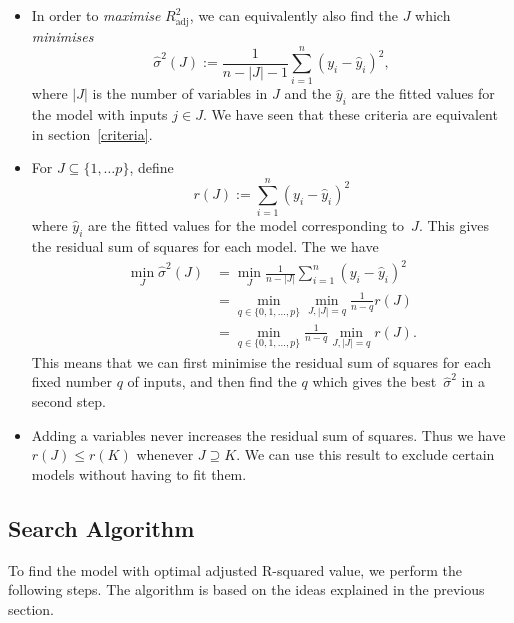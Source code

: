 \documentclass[
  a4paper,
]{article}
\theoremstyle{definition}
\theoremstyle{definition}
\theoremstyle{definition}
\theoremstyle{definition}
\theoremstyle{remark}
\begin{document}
\begin{itemize}
\item
  In order to \emph{maximise} \(R^2_\mathrm{adj}\), we can equivalently also
  find the \(J\) which \emph{minimises}
  \begin{equation*}
    \hat\sigma^2(J)
      := \frac{1}{n - |J| - 1} \sum_{i=1}^n (y_i - \hat y_i)^2,
  \end{equation*}
  where \(|J|\) is the number of variables in \(J\) and the
  \(\hat y_i\) are the fitted values for the model with inputs \(j \in J\).
  We have seen that these criteria are equivalent in section~\ref{criteria}.
\item
  For \(J \subseteq \{1, \ldots p\}\), define
  \begin{equation*}
    r(J)
      := \sum_{i=1}^n (y_i - \hat y_i)^2
  \end{equation*}
  where \(\hat y_i\) are the fitted values for the model corresponding to~\(J\).
  This gives the residual sum of squares for each model. The we have
  \begin{align*}
    \min_J \hat\sigma^2(J)
      &= \min_J \frac{1}{n - |J|} \sum_{i=1}^n (y_i - \hat y_i)^2 \\
      &= \min_{q \in \{0, 1, \ldots, p\}} \min_{J, |J|=q} \frac{1}{n - q} r(J) \\
      &= \min_{q \in \{0, 1, \ldots, p\}} \frac{1}{n - q} \min_{J, |J|=q} r(J).
  \end{align*}
  This means that we can first minimise the residual sum of squares
  for each fixed number \(q\) of inputs, and then find the \(q\)
  which gives the best~\(\hat\sigma^2\) in a second step.
\item
  Adding a variables never increases the residual sum of squares.
  Thus we have \(r(J) \leq r(K)\) whenever \(J \supseteq K\).
  We can use this result to exclude certain models without having to fit them.
\end{itemize}

\hypertarget{search-algorithm}{%
\subsection{Search Algorithm}\label{search-algorithm}}

To find the model with optimal adjusted R-squared value, we perform the
following steps. The algorithm is based on the ideas explained in the previous
section.
\end{document}
